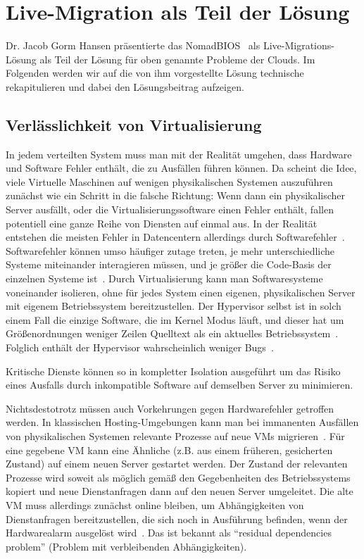 \section{Live-Migration als Teil der Lösung}
\label{sec:livemigration}
Dr. Jacob Gorm Hansen präsentierte das NomadBIOS~\cite{needed} als
Live-Migrations-Lösung als Teil der Lösung für oben genannte
Probleme der Clouds. Im Folgenden werden wir auf die von ihm
vorgestellte Lösung technische rekapitulieren und dabei den
Lösungsbeitrag aufzeigen.

\subsection{Verlässlichkeit von Virtualisierung}
In jedem verteilten System muss man mit der Realität umgehen, dass
Hardware und Software Fehler enthält, die zu Ausfällen führen
können. Da scheint die Idee, viele Virtuelle Maschinen auf wenigen
physikalischen Systemen auszuführen zunächst wie ein Schritt in die
falsche Richtung: Wenn dann ein physikalischer Server ausfällt, oder
die Virtualisierungssoftware einen Fehler enthält, fallen potentiell
eine ganze Reihe von Diensten auf einmal aus. In der Realität
entstehen die meisten Fehler in Datencentern allerdings durch
Softwarefehler~\cite{tanenbaum1992modern}. Softwarefehler können umso
häufiger zutage treten, je mehr unterschiedliche Systeme miteinander
interagieren müssen, und je größer die Code-Basis der einzelnen
Systeme ist~\cite{zellerprograms}. Durch Virtualisierung kann man
Softwaresysteme voneinander isolieren, ohne für jedes System einen
eigenen, physikalischen Server mit eigenem Betriebssystem
bereitzustellen. Der Hypervisor selbst ist in solch einem Fall die
einzige Software, die im Kernel Modus läuft, und dieser hat um
Größenordnungen weniger Zeilen Quelltext als ein aktuelles
Betriebssystem~\cite{tanenbaum1992modern}. Folglich enthält der
Hypervisor wahrscheinlich weniger Bugs~\cite{zellerprograms}.

Kritische Dienste können so in kompletter Isolation ausgeführt um das
Risiko eines Ausfalls durch inkompatible Software auf demselben Server
zu minimieren.

Nichtsdestotrotz müssen auch Vorkehrungen gegen Hardwarefehler
getroffen werden. In klassischen Hosting-Umgebungen kann man bei
immanenten Ausfällen von physikalischen Systemen relevante Prozesse
auf neue VMs migrieren~\cite{hansen2004self}. Für eine gegebene VM
kann eine Ähnliche (z.B. aus einem früheren, gesicherten Zustand) auf
einem neuen Server gestartet werden. Der Zustand der relevanten
Prozesse wird soweit als möglich gemäß den Gegebenheiten des
Betriebssystems kopiert und neue Dienstanfragen dann auf den neuen
Server umgeleitet. Die alte VM muss allerdings zunächst online
bleiben, um Abhängigkeiten von Dienstanfragen bereitzustellen, die
sich noch in Ausführung befinden, wenn der Hardwarealarm ausgelöst
wird~\cite{clark2005live}. Das ist bekannt als "`residual
dependencies problem"' (Problem mit verbleibenden Abhängigkeiten).

